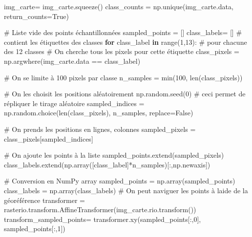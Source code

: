 \documentclass[
  french,
  11pt,
  letterpaper,
  open=any,
  twoside=false,
  french]{scrbook}
\newenvironment{Shaded}{\begin{snugshade}}{\end{snugshade}}
\newcommand{\BuiltInTok}[1]{\textcolor[rgb]{0.00,0.23,0.31}{#1}}
\newcommand{\CommentTok}[1]{\textcolor[rgb]{0.37,0.37,0.37}{#1}}
\newcommand{\ControlFlowTok}[1]{\textcolor[rgb]{0.00,0.23,0.31}{\textbf{#1}}}
\newcommand{\DecValTok}[1]{\textcolor[rgb]{0.68,0.00,0.00}{#1}}
\newcommand{\KeywordTok}[1]{\textcolor[rgb]{0.00,0.23,0.31}{\textbf{#1}}}
\newcommand{\NormalTok}[1]{\textcolor[rgb]{0.00,0.23,0.31}{#1}}
\newcommand{\OperatorTok}[1]{\textcolor[rgb]{0.37,0.37,0.37}{#1}}
\newcommand{\VariableTok}[1]{\textcolor[rgb]{0.07,0.07,0.07}{#1}}
\begin{document}
\begin{Shaded}
\begin{Highlighting}[]
\NormalTok{img\_carte}\OperatorTok{=}\NormalTok{ img\_carte.squeeze()}
\NormalTok{class\_counts }\OperatorTok{=}\NormalTok{ np.unique(img\_carte.data, return\_counts}\OperatorTok{=}\VariableTok{True}\NormalTok{)}

\CommentTok{\# Liste vide des points échantillonnées}
\NormalTok{sampled\_points }\OperatorTok{=}\NormalTok{ []}
\NormalTok{class\_labels}\OperatorTok{=}\NormalTok{ [] }\CommentTok{\# contient les étiquettes des classes}
\ControlFlowTok{for}\NormalTok{ class\_label }\KeywordTok{in} \BuiltInTok{range}\NormalTok{(}\DecValTok{1}\NormalTok{,}\DecValTok{13}\NormalTok{): }\CommentTok{\# pour chacune des 12 classes}
  \CommentTok{\# On cherche tous les pixels pour cette étiquette}
\NormalTok{  class\_pixels }\OperatorTok{=}\NormalTok{ np.argwhere(img\_carte.data }\OperatorTok{==}\NormalTok{ class\_label)}

  \CommentTok{\# On se limite à 100 pixels par classe}
\NormalTok{  n\_samples }\OperatorTok{=} \BuiltInTok{min}\NormalTok{(}\DecValTok{100}\NormalTok{, }\BuiltInTok{len}\NormalTok{(class\_pixels))}

  \CommentTok{\# On les choisit les positions aléatoirement}
\NormalTok{  np.random.seed(}\DecValTok{0}\NormalTok{) }\CommentTok{\# ceci permet de répliquer le tirage aléatoire}
\NormalTok{  sampled\_indices }\OperatorTok{=}\NormalTok{ np.random.choice(}\BuiltInTok{len}\NormalTok{(class\_pixels), n\_samples, replace}\OperatorTok{=}\VariableTok{False}\NormalTok{)}

  \CommentTok{\# On prends les positions en lignes, colonnes}
\NormalTok{  sampled\_pixels }\OperatorTok{=}\NormalTok{ class\_pixels[sampled\_indices]}

  \CommentTok{\# On ajoute les points à la liste}
\NormalTok{  sampled\_points.extend(sampled\_pixels)}
\NormalTok{  class\_labels.extend(np.array([class\_label]}\OperatorTok{*}\NormalTok{n\_samples)[:,np.newaxis])}

\CommentTok{\# Conversion en NumPy array}
\NormalTok{sampled\_points }\OperatorTok{=}\NormalTok{ np.array(sampled\_points)}
\NormalTok{class\_labels }\OperatorTok{=}\NormalTok{ np.array(class\_labels)}
\CommentTok{\# On peut naviguer les points à l\textquotesingle{}aide de la géoréférence}
\NormalTok{transformer }\OperatorTok{=}\NormalTok{ rasterio.transform.AffineTransformer(img\_carte.rio.transform())}
\NormalTok{transform\_sampled\_points}\OperatorTok{=}\NormalTok{ transformer.xy(sampled\_points[:,}\DecValTok{0}\NormalTok{], sampled\_points[:,}\DecValTok{1}\NormalTok{])}


\end{Highlighting}
\end{Shaded}
\end{document}
